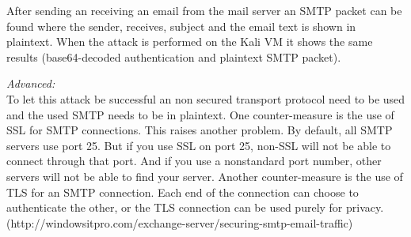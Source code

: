 After sending an receiving an email from the mail server an \ac{SMTP} packet can be found where the sender, receives, subject and the email text is shown in plaintext. When the attack is performed on the Kali VM it shows the same results (base64-decoded authentication and plaintext \ac{SMTP} packet).

\textit{Advanced:}\\
To let this attack be successful an non secured transport protocol need to be used and the used \ac{SMTP} needs to be in plaintext.
One counter-measure is the use of \ac{SSL} for \ac{SMTP} connections. This raises another problem. By default, all \ac{SMTP} servers use port 25. But if you use \ac{SSL} on port 25, non-\ac{SSL} will not be able to connect through that port. And if you use a nonstandard port number, other servers will not be able to find your server.
Another counter-measure is the use of \ac{TLS} for an \ac{SMTP} connection. Each end of the connection can choose to authenticate the other, or the \ac{TLS} connection can be used purely for privacy. (http://windowsitpro.com/exchange-server/securing-smtp-email-traffic)